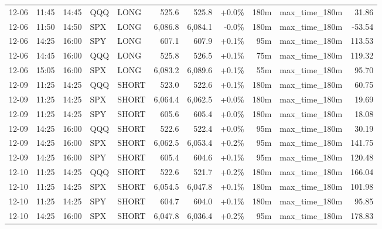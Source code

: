 \documentclass[11pt,a4paper,twoside]{article}
\begin{document}
\begin{center}
\begin{longtable}{>{\color{txtmain}}l l l l l r r r r >{\color{txtmain}}l r}
12-06 & 11:45 & 14:45 & QQQ & LONG & 525.6 & 525.8 & \textcolor{wingreen}{+0.0\%} & 180m & max\_time\_180m & \textcolor{wingreen}{31.86} \\
12-06 & 11:50 & 14:50 & SPX & LONG & 6,086.8 & 6,084.1 & \textcolor{lossred}{-0.0\%} & 180m & max\_time\_180m & \textcolor{lossred}{-53.54} \\
12-06 & 14:25 & 16:00 & SPY & LONG & 607.1 & 607.9 & \textcolor{wingreen}{+0.1\%} & 95m & max\_time\_180m & \textcolor{wingreen}{113.53} \\
12-06 & 14:45 & 16:00 & QQQ & LONG & 525.8 & 526.5 & \textcolor{wingreen}{+0.1\%} & 75m & max\_time\_180m & \textcolor{wingreen}{119.32} \\
12-06 & 15:05 & 16:00 & SPX & LONG & 6,083.2 & 6,089.6 & \textcolor{wingreen}{+0.1\%} & 55m & max\_time\_180m & \textcolor{wingreen}{95.70} \\
12-09 & 11:25 & 14:25 & QQQ & SHORT & 523.0 & 522.6 & \textcolor{wingreen}{+0.1\%} & 180m & max\_time\_180m & \textcolor{wingreen}{60.75} \\
12-09 & 11:25 & 14:25 & SPX & SHORT & 6,064.4 & 6,062.5 & \textcolor{wingreen}{+0.0\%} & 180m & max\_time\_180m & \textcolor{wingreen}{19.69} \\
12-09 & 11:25 & 14:25 & SPY & SHORT & 605.6 & 605.4 & \textcolor{wingreen}{+0.0\%} & 180m & max\_time\_180m & \textcolor{wingreen}{18.08} \\
12-09 & 14:25 & 16:00 & QQQ & SHORT & 522.6 & 522.4 & \textcolor{wingreen}{+0.0\%} & 95m & max\_time\_180m & \textcolor{wingreen}{30.19} \\
12-09 & 14:25 & 16:00 & SPX & SHORT & 6,062.5 & 6,053.4 & \textcolor{wingreen}{+0.2\%} & 95m & max\_time\_180m & \textcolor{wingreen}{141.75} \\
12-09 & 14:25 & 16:00 & SPY & SHORT & 605.4 & 604.6 & \textcolor{wingreen}{+0.1\%} & 95m & max\_time\_180m & \textcolor{wingreen}{120.48} \\
12-10 & 11:25 & 14:25 & QQQ & SHORT & 522.6 & 521.7 & \textcolor{wingreen}{+0.2\%} & 180m & max\_time\_180m & \textcolor{wingreen}{166.04} \\
12-10 & 11:25 & 14:25 & SPX & SHORT & 6,054.5 & 6,047.8 & \textcolor{wingreen}{+0.1\%} & 180m & max\_time\_180m & \textcolor{wingreen}{101.98} \\
12-10 & 11:25 & 14:25 & SPY & SHORT & 604.7 & 604.0 & \textcolor{wingreen}{+0.1\%} & 180m & max\_time\_180m & \textcolor{wingreen}{95.85} \\
12-10 & 14:25 & 16:00 & SPX & SHORT & 6,047.8 & 6,036.4 & \textcolor{wingreen}{+0.2\%} & 95m & max\_time\_180m & \textcolor{wingreen}{178.83} \\

\end{longtable}
\end{center}
\end{document}
